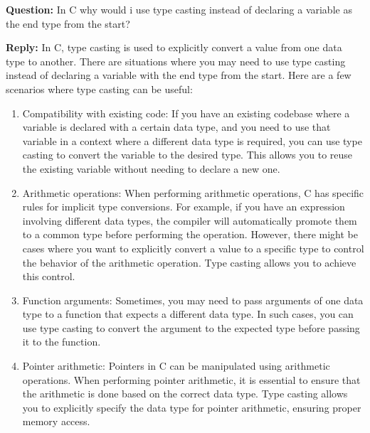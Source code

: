 \documentclass[12pt, letterpaper]{report}
\begin{document}
\begin{tcolorbox}[colback=white,colframe=black]
    \textbf{Question:} In C why would i use type casting instead of declaring a variable as the
	end type from the start?
\end{tcolorbox}

\begin{tcolorbox}[colback=white,colframe=gray]
    \textbf{Reply:} In C, type casting is used to explicitly convert a value 
	from one data type to another. There are situations where you may need to 
	use type casting instead of declaring a variable with the end type from 
	the start. Here are a few scenarios where type casting can be useful:
	\begin{enumerate}
		\item Compatibility with existing code: If you have an existing 
			codebase where a variable is declared with a certain data type, 
			and you need to use that variable in a context where a different 
			data type is required, you can use type casting to convert the 
			variable to the desired type. This allows you to reuse the 
			existing variable without needing to declare a new one.

		\item Arithmetic operations: When performing arithmetic operations, C 
			has specific rules for implicit type conversions. For example, if 
			you have an expression involving different data types, the compiler 
			will automatically promote them to a common type before performing 
			the operation. However, there might be cases where you want to 
			explicitly convert a value to a specific type to control the 
			behavior of the arithmetic operation. Type casting allows you to 
			achieve this control.

		\item Function arguments: Sometimes, you may need to pass arguments of 
			one data type to a function that expects a different data type. In 
			such cases, you can use type casting to convert the argument to 
			the expected type before passing it to the function.

		\item Pointer arithmetic: Pointers in C can be manipulated using 
			arithmetic operations. When performing pointer arithmetic, it is 
			essential to ensure that the arithmetic is done based on the 
			correct data type. Type casting allows you to explicitly specify 
			the data type for pointer arithmetic, ensuring proper memory access.


\end{enumerate}
\end{tcolorbox}
\end{document}
